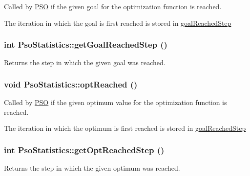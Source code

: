 Called by \hyperlink{classPSO}{PSO} if the given goal for the optimization function is reached. 

The iteration in which the goal is first reached is stored in \hyperlink{classPsoStatistics_d4b9e6fa2b084958183b90d555103b15}{goalReachedStep} \hypertarget{classPsoStatistics_bef775b48736dda499fdff45c9e047c0}{
\subsubsection{\setlength{\rightskip}{0pt plus 5cm}int PsoStatistics::getGoalReachedStep ()}}
\label{classPsoStatistics_bef775b48736dda499fdff45c9e047c0}


Returns the step in which the given goal was reached. 

\hypertarget{classPsoStatistics_032e6c1d794cf3c6dd083c20d3a6ad17}{
\subsubsection{\setlength{\rightskip}{0pt plus 5cm}void PsoStatistics::optReached ()}}
\label{classPsoStatistics_032e6c1d794cf3c6dd083c20d3a6ad17}


Called by \hyperlink{classPSO}{PSO} if the given optimum value for the optimization function is reached. 

The iteration in which the optimum is first reached is stored in \hyperlink{classPsoStatistics_d4b9e6fa2b084958183b90d555103b15}{goalReachedStep} \hypertarget{classPsoStatistics_eebf5de7f3d5d624caba604747d149c4}{
\subsubsection{\setlength{\rightskip}{0pt plus 5cm}int PsoStatistics::getOptReachedStep ()}}
\label{classPsoStatistics_eebf5de7f3d5d624caba604747d149c4}


Returns the step in which the given optimum was reached. 

